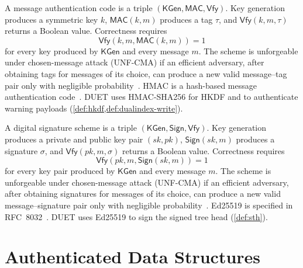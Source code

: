 \begin{definition}\label{def:mac}
A message authentication code is a triple
$(\mathsf{KGen},\mathsf{MAC},\mathsf{Vfy})$. Key generation produces a symmetric key $k$,
$\mathsf{MAC}(k,m)$ produces a tag $\tau$, and $\mathsf{Vfy}(k,m,\tau)$ returns a Boolean value.
Correctness requires
\[
\mathsf{Vfy}(k,m,\mathsf{MAC}(k,m))=1
\]
for every key produced by $\mathsf{KGen}$ and every message $m$. The scheme is unforgeable under
chosen-message attack (UNF-CMA) if an efficient adversary, after
obtaining tags for messages of its choice, can produce a new valid message--tag pair only with
negligible probability~\cite{dowling2025mackdfs}. HMAC is a hash-based message authentication
code~\cite{dowling2025mackdfs}. DUET uses HMAC-SHA256 for HKDF and to authenticate warning
payloads (\cref{def:hkdf,def:dualindex-write}).
\end{definition}

\begin{definition}\label{def:sig}
A digital signature scheme is a triple
$(\mathsf{KGen},\mathsf{Sign},\mathsf{Vfy})$. Key generation produces a private and public key pair
$(\mathit{sk},\mathit{pk})$, $\mathsf{Sign}(\mathit{sk},m)$ produces a signature $\sigma$, and
$\mathsf{Vfy}(\mathit{pk},m,\sigma)$ returns a Boolean value. Correctness requires
\[
\mathsf{Vfy}(\mathit{pk},m,\mathsf{Sign}(\mathit{sk},m))=1
\]
for every key pair produced by $\mathsf{KGen}$ and every message $m$. The scheme is unforgeable
under chosen-message attack (UNF-CMA) if an efficient adversary, after
obtaining signatures for messages of its choice, can produce a new valid message--signature pair
only with negligible probability~\cite{dowling2025signatures}. Ed25519 is specified in
RFC~8032~\cite[Section~5.1]{rfc8032}. DUET uses Ed25519 to sign the signed tree head
(\cref{def:sth}).
\end{definition}

\section{Authenticated Data Structures}\label{sec:def-structures}

